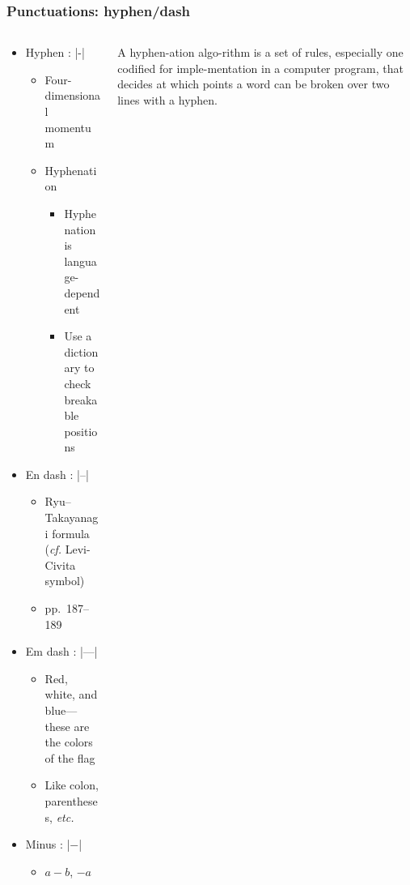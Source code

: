 \begin{frame}[fragile]
\frametitle{Punctuations: hyphen/dash}
\begin{columns}
\begin{column}{0.84\textwidth}
  \begin{itemize}
    \item<1-> Hyphen : |-|

      \begin{itemize}
        \item Four-dimensional momentum
        \item Hyphenation

          \begin{itemize}
            \item Hyphenation is language-dependent
            \item Use a dictionary to check breakable positions
          \end{itemize}
      \end{itemize}

    \item<3-> En dash : |--|

      \begin{itemize}
        \item Ryu--Takayanagi formula (\textit{cf.} Levi-Civita symbol)
        \item pp.~187--189
      \end{itemize}

    \item<4-> Em dash : |---|

      \begin{itemize}
        \item Red, white, and blue---these are the colors of the flag
        \item Like colon, parentheses, \textit{etc.}
      \end{itemize}

    \item<5-> Minus : |$-$|

      \begin{itemize}
        \item $a-b$, $-a$
      \end{itemize}
  \end{itemize}
\end{column}
\begin{column}{0.13\textwidth}
  \tiny\RaggedRight
  A hyphen\alert{-}ation algo\alert{-}rithm is a set of rules, especially one codified
  for imple\alert{-}mentation in a computer program, that decides at which points
  a word can be broken over two lines with a hyphen.
\end{column}
\end{columns}
\end{frame}

